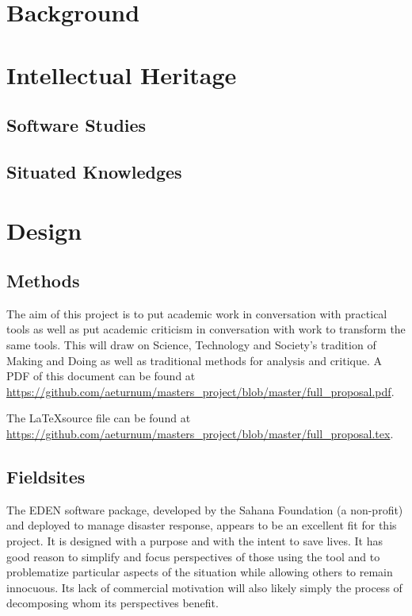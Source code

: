 \documentclass[a4paper,man,natbib]{apa6}
\begin{document}
   \section*{Background}
   \section*{Intellectual Heritage}
   \subsection*{Software Studies}
   \subsection*{Situated Knowledges}
   \section*{Design}
   \subsection*{Methods}
   The aim of this project is to put academic work in conversation with practical tools as well as put academic criticism in conversation with work to  transform the same tools. This will draw on Science, Technology and Society's tradition of Making and Doing as well as traditional methods for analysis and critique.
   A PDF of this document can be found at \url{https://github.com/aeturnum/masters_project/blob/master/full_proposal.pdf}.

   The \LaTeX source file can be found at \url{https://github.com/aeturnum/masters_project/blob/master/full_proposal.tex}.
   \subsection*{Fieldsites}

   The EDEN software package, developed by the Sahana Foundation (a non-profit) and deployed to manage disaster response, appears to be an excellent fit for this project. It is designed with a purpose and with the intent to save lives. It has good reason to simplify and focus perspectives of those using the tool and to problematize particular aspects of the situation while allowing others to remain innocuous. Its lack of commercial motivation will also likely simply the process of decomposing whom its perspectives benefit.
\end{document}
